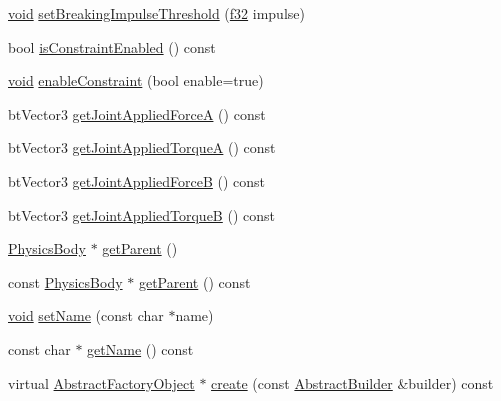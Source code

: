 \begin{DoxyCompactItemize}
\item 
\mbox{\hyperlink{_thread_8h_af1e856da2e658414cb2456cb6f7ebc66}{void}} \mbox{\hyperlink{classnjli_1_1_physics_constraint_aff159cbeea66d0f2598172e7cecf2269}{set\+Breaking\+Impulse\+Threshold}} (\mbox{\hyperlink{_util_8h_a5f6906312a689f27d70e9d086649d3fd}{f32}} impulse)
\item 
bool \mbox{\hyperlink{classnjli_1_1_physics_constraint_abb9996d3456e93ba7027d85f038d10a9}{is\+Constraint\+Enabled}} () const
\item 
\mbox{\hyperlink{_thread_8h_af1e856da2e658414cb2456cb6f7ebc66}{void}} \mbox{\hyperlink{classnjli_1_1_physics_constraint_a2c3b06804d8447485c9170bca568b244}{enable\+Constraint}} (bool enable=true)
\item 
bt\+Vector3 \mbox{\hyperlink{classnjli_1_1_physics_constraint_a2a02805fa70d5ba764986a0678dacb57}{get\+Joint\+Applied\+ForceA}} () const
\item 
bt\+Vector3 \mbox{\hyperlink{classnjli_1_1_physics_constraint_a4fb1d50043e450fd584d12852a756c79}{get\+Joint\+Applied\+TorqueA}} () const
\item 
bt\+Vector3 \mbox{\hyperlink{classnjli_1_1_physics_constraint_a62b371d9914b2206441be949df162afb}{get\+Joint\+Applied\+ForceB}} () const
\item 
bt\+Vector3 \mbox{\hyperlink{classnjli_1_1_physics_constraint_a1df0c51cb5bb8bebbfc4474908df3f74}{get\+Joint\+Applied\+TorqueB}} () const
\item 
\mbox{\hyperlink{classnjli_1_1_physics_body}{Physics\+Body}} $\ast$ \mbox{\hyperlink{classnjli_1_1_physics_constraint_aea662a8e9b6eb74c2f772d35226aa79b}{get\+Parent}} ()
\item 
const \mbox{\hyperlink{classnjli_1_1_physics_body}{Physics\+Body}} $\ast$ \mbox{\hyperlink{classnjli_1_1_physics_constraint_a206984148059aa74e81ee7a3ae09ecb5}{get\+Parent}} () const
\item 
\mbox{\hyperlink{_thread_8h_af1e856da2e658414cb2456cb6f7ebc66}{void}} \mbox{\hyperlink{classnjli_1_1_physics_constraint_a087eb5f8d9f51cc476f12f1d10a3cb95}{set\+Name}} (const char $\ast$name)
\item 
const char $\ast$ \mbox{\hyperlink{classnjli_1_1_physics_constraint_ad41266885be835f3ee602311e20877a4}{get\+Name}} () const
\item 
virtual \mbox{\hyperlink{classnjli_1_1_abstract_factory_object}{Abstract\+Factory\+Object}} $\ast$ \mbox{\hyperlink{classnjli_1_1_physics_constraint_a83a8876ae63b92804004cf3febe76573}{create}} (const \mbox{\hyperlink{classnjli_1_1_abstract_builder}{Abstract\+Builder}} \&builder) const

\end{DoxyCompactItemize}

